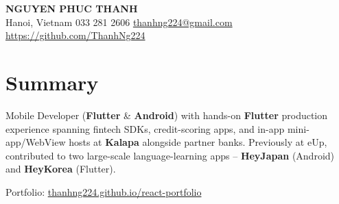 \begin{center}
    \textbf{\Huge \scshape NGUYEN PHUC THANH} \\[10pt]
    \small Hanoi, Vietnam \textbar{} 033 281 2606 \textbar{} \href{mailto:thanhng224@gmail.com}{thanhng224@gmail.com} \textbar{} \href{https://github.com/ThanhNg224}{https://github.com/ThanhNg224}
\end{center}

\section*{Summary}
\noindent Mobile Developer (\textbf{Flutter} \& \textbf{Android}) with hands-on \textbf{Flutter} production experience spanning fintech SDKs, credit-scoring apps, and in-app mini-app/WebView hosts at \textbf{Kalapa} alongside partner banks. Previously at eUp, contributed to two large-scale language-learning apps -- \textbf{HeyJapan} (Android) and \textbf{HeyKorea} (Flutter).

\vspace{4pt}
\noindent Portfolio: \href{https://thanhng224.github.io/react-portfolio/}{thanhng224.github.io/react-portfolio}
